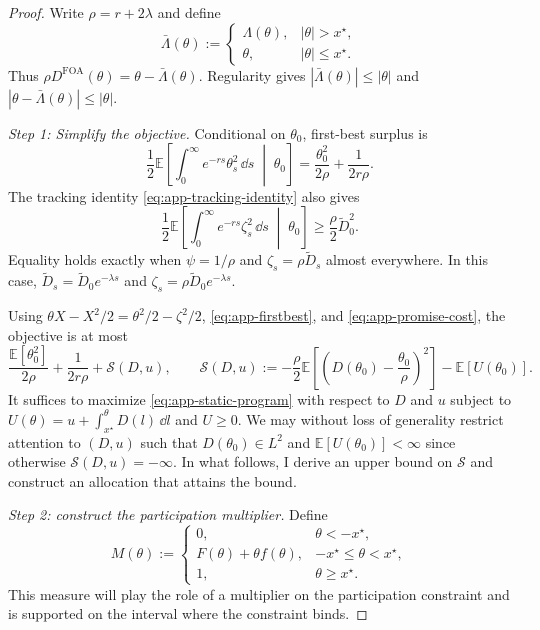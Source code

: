 \documentclass[12pt]{article}
\newcommand{\E}{\mathbb{E}}
\begin{document}
\begin{proof}

Write \(\rho=r+2\lambda\) and define
\[
  \bar\Lambda(\theta):=
  \begin{cases}
    \Lambda(\theta),&|\theta|>x^\star,\\
    \theta,&|\theta|\leq x^\star.
  \end{cases}
\]
Thus \(\rho D^{\mathrm{FOA}}(\theta)=\theta-\bar\Lambda(\theta)\).
Regularity gives
\(|\bar\Lambda(\theta)|\leq|\theta|\) and
\(|\theta-\bar\Lambda(\theta)|\leq|\theta|\).

\emph{Step 1: Simplify the objective.} Conditional on \(\theta_0\), first-best surplus is
\begin{equation}\label{eq:app-firstbest}
  \frac12\E\left[
    \int_0^\infty e^{-rs}\theta_s^2\,\dd s
    \;\middle|\;\theta_0
  \right]
  =
  \frac{\theta_0^2}{2\rho}+\frac{1}{2r\rho}.
\end{equation}
The tracking identity \eqref{eq:app-tracking-identity} also gives
\begin{equation}\label{eq:app-promise-cost}
  \frac12\E\left[
    \int_0^\infty e^{-rs}\zeta_s^2\,\dd s
    \;\middle|\;\theta_0
  \right]
  \geq
  \frac{\rho}{2}\widetilde D_0^2.
\end{equation}
Equality holds exactly when \(\psi=1/\rho\) and
\(\zeta_s=\rho\widetilde D_s\) almost everywhere. In this case, 
  $\widetilde D_s=\widetilde D_0e^{-\lambda s}$ and
  $\zeta_s=\rho\widetilde D_0e^{-\lambda s}.$

Using
\(\theta X-X^2/2=\theta^2/2-\zeta^2/2\),
\eqref{eq:app-firstbest}, and \eqref{eq:app-promise-cost}, the 
objective is at most
\begin{equation}\label{eq:app-static-program}
  \frac{\E[\theta_0^2]}{2\rho}
  +\frac{1}{2r\rho}
  +\mathcal S(D,u),
  \qquad
  \mathcal S(D,u)
  :=
  -\frac{\rho}{2}\E\left[
    \left(D(\theta_0)-\frac{\theta_0}{\rho}\right)^2
  \right]
  -\E[U(\theta_0)].
\end{equation}
It suffices to maximize \eqref{eq:app-static-program} with respect to $D$ and $u$ subject to \(U(\theta)=u+\int_{x^\star}^{\theta}D(l)\,\dd l\) and \(U\geq 0\). We may without loss of generality restrict attention to $(D,u)$ such that
\(D(\theta_0)\in L^2\) and
\(\E[U(\theta_0)]<\infty\) since otherwise $\mathcal S(D,u)=-\infty$. In what follows, I derive an upper bound on
\(\mathcal S\) and construct an allocation that attains the bound.

\emph{Step 2: construct the participation multiplier.}
Define
\[
  M(\theta):=
  \begin{cases}
    0, & \theta<-x^\star,\\
    F(\theta)+\theta f(\theta),
      & -x^\star\leq\theta<x^\star,\\
    1, & \theta\geq x^\star.
  \end{cases}
\]
This measure will play the role of a multiplier on the participation constraint and is supported on the interval where the constraint binds.


\end{proof}
\end{document}
